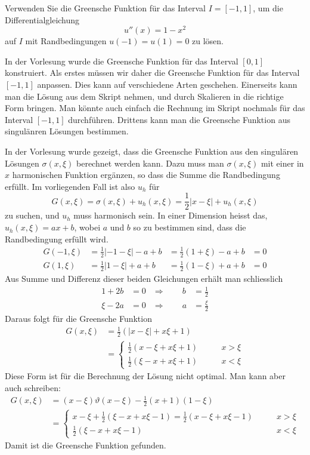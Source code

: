 Verwenden Sie die Greensche Funktion für das Interval $I=[-1,1]$,
um die Differentialgleichung
\[
u''(x)=1-x^2
\]
auf $I$ mit Randbedingungen $u(-1)=u(1)=0$
zu lösen.

\begin{loesung}
In der Vorlesung wurde die Greensche Funktion für das Interval
$[0,1]$ konstruiert. Als erstes müssen wir daher die Greensche
Funktion für das Interval $[-1,1]$ anpassen. Dies kann auf
verschiedene Arten geschehen.
Einerseits kann man die Lösung aus dem
Skript nehmen, und durch Skalieren in die richtige Form bringen.
Man könnte auch einfach die Rechnung im Skript nochmals für
das Interval $[-1,1]$ durchführen. Drittens kann man
die Greensche Funktion aus singulänren Lösungen bestimmen.

In der Vorlesung wurde gezeigt, dass die Greensche Funktion
aus den singulären Lösungen $\sigma(x,\xi)$ berechnet werden
kann. Dazu muss man $\sigma(x,\xi)$ mit einer in $x$ harmonischen
Funktion ergänzen, so dass die Summe die Randbedingung erfüllt.
Im vorliegenden Fall ist also $u_h$ für
\[
G(x,\xi)=\sigma(x,\xi)+u_h(x,\xi)
=
{\textstyle\frac12}|x-\xi|+u_h(x,\xi)
\]
zu suchen, und $u_h$ muss harmonisch sein. In einer Dimension
heisst das,
$u_h(x,\xi)=ax+b$, wobei $a$ und $b$ so zu bestimmen sind, dass die
Randbedingung erfüllt wird.
\begin{align*}
G(-1,\xi)&={\textstyle\frac12}|-1-\xi|-a+b&={\textstyle\frac12}(1+\xi)-a+b&=0\\
G(1,\xi)&={\textstyle\frac12}|1-\xi|+a+b&={\textstyle\frac12}(1-\xi)+a+b&=0
\end{align*}
Aus Summe und Differenz dieser beiden Gleichungen erhält man
schliesslich
\begin{align*}
1+2b&=0&\Rightarrow\qquad b&=\frac12\\
\xi-2a&=0&\Rightarrow\qquad a&=\frac{\xi}2
\end{align*}
Daraus folgt für die Greensche Funktion
\begin{align*}
G(x,\xi)
&=
{\textstyle\frac12}(|x-\xi|+x\xi+1)
\\
&=
\begin{cases}
{\textstyle\frac12}(x-\xi+x\xi + 1)
&\qquad x>\xi\\
{\textstyle\frac12}(\xi-x+x\xi + 1)
&\qquad x<\xi
\end{cases}
\end{align*}
Diese Form ist für die Berechnung der Lösung nicht optimal. Man kann
aber auch schreiben:
\begin{align*}
G(x,\xi)
&=
(x-\xi)\vartheta(x-\xi)-{\textstyle\frac12}(x+1)(1-\xi)
\\
&=
\begin{cases}
x-\xi
+
{\textstyle\frac12}(\xi-x+x\xi-1)
=
{\textstyle\frac12}(x-\xi+x\xi-1)
&\qquad x>\xi\\
{\textstyle\frac12}(\xi-x+x\xi-1)
&\qquad x<\xi
\end{cases}
\end{align*}
Damit ist die Greensche Funktion gefunden.


\end{loesung}
